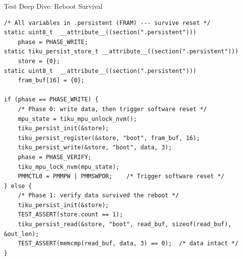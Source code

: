 \documentclass[aspectratio=169, 10pt]{beamer}
\begin{document}
\begin{frame}[fragile]{Test Deep Dive: Reboot Survival}
\begin{lstlisting}[style=cstyle, title={Reboot survival --- two-phase test across real hardware reset}]
/* All variables in .persistent (FRAM) --- survive reset */
static uint8_t  __attribute__((section(".persistent")))
    phase = PHASE_WRITE;
static tiku_persist_store_t __attribute__((section(".persistent")))
    store = {0};
static uint8_t  __attribute__((section(".persistent")))
    fram_buf[16] = {0};

if (phase == PHASE_WRITE) {
    /* Phase 0: write data, then trigger software reset */
    mpu_state = tiku_mpu_unlock_nvm();
    tiku_persist_init(&store);
    tiku_persist_register(&store, "boot", fram_buf, 16);
    tiku_persist_write(&store, "boot", data, 3);
    phase = PHASE_VERIFY;
    tiku_mpu_lock_nvm(mpu_state);
    PMMCTL0 = PMMPW | PMMSWPOR;    /* Trigger software reset */
} else {
    /* Phase 1: verify data survived the reboot */
    tiku_persist_init(&store);
    TEST_ASSERT(store.count == 1);
    tiku_persist_read(&store, "boot", read_buf, sizeof(read_buf), &out_len);
    TEST_ASSERT(memcmp(read_buf, data, 3) == 0);  /* data intact */
}
\end{lstlisting}
\end{frame}
\end{document}
